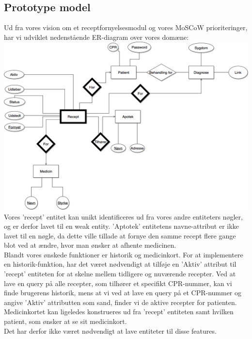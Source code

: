 \subsection{Prototype model}
Ud fra vores vision om et receptfornyelsesmodul og vores MoSCoW prioriteringer, har vi udviklet nedenstående ER-diagram over vores domæne:
\\
\includegraphics[width=\linewidth]{Materials/Prototype/ER_prototype}\\
Vores 'recept' entitet kan unikt identificeres ud fra vores andre entiteters nøgler, og er derfor lavet til en weak entity. 'Aptotek' entitetens navne-attribut er ikke lavet til en nøgle, da dette ville tillade at fornye den samme recept flere gange blot ved at ændre, hvor man ønsker at afhente medicinen.\\
Blandt vores ønskede funktioner er historik og medicinkort. For at implementere en historik-funktion, har det været nødvendigt at tilføje en 'Aktiv' attribut til 'recept' entiteten for at skelne mellem tidligere og nuværende recepter. Ved at lave en query på alle recepter, som tilhører et specifikt CPR-nummer, kan vi finde brugerens historik, mens at vi ved at lave en query på et CPR-nummer og angive 'Aktiv' attributten som sand, finder vi de aktive recepter for patienten.\\
Medicinkortet kan ligeledes konstrueres ud fra 'recept' entiteten samt hvilken patient, som ønsker at se sit medicinkort.\\ 
Det har derfor ikke været nødvendigt at lave entiteter til disse features.\\

